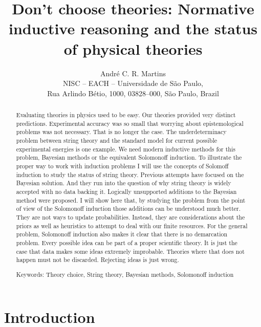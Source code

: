 \documentclass{article}
\title{Don't choose theories: Normative inductive reasoning and the status of physical theories}
\author{Andr\'e C. R. Martins \\%
	NISC -- EACH -- Universidade de S\~ao Paulo,\\
	Rua Arlindo B\'etio, 1000, 03828--000,  S\~ao Paulo, Brazil}
\begin{document}
	
	
	
	
	
	
	\maketitle
	
	
	
	\begin{abstract}
		
		Evaluating theories in physics used to be easy. Our theories provided very distinct predictions. Experimental accuracy was so small that worrying about epistemological problems was not necessary. That is no longer the case. The underdeterminacy problem between string theory and the standard model for current possible experimental energies is one example. We need modern inductive methods for this problem, Bayesian methods or the equivalent Solomonoff induction. To illustrate the proper way to work with induction problems I will use the concepts of Solomoff induction to study the status of string theory. Previous attempts have focused on the Bayesian solution. And they run into the question of why string theory is widely accepted with no data backing it.  Logically unsupported additions to the Bayesian method were proposed.  I will show here that, by studying the problem from the point of view of the Solomonoff induction those additions can be understood much better. They are not ways to update probabilities. Instead, they are considerations about the priors as well as heuristics to attempt to deal with our finite resources. For the general problem, Solomonoff induction also makes it clear that there is no demarcation problem. Every possible idea can be part of a proper scientific theory. It is just the case that data makes some ideas extremely improbable. Theories where that does not happen must not be discarded. Rejecting ideas is just wrong.
		
		
		
		Keywords:  Theory choice, String theory, Bayesian methods, Solomonoff induction
		
		
	\end{abstract}
	
	
	
	
	\section{Introduction}
	
\end{document}
